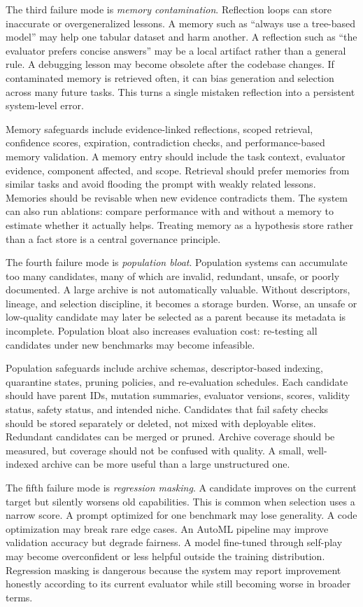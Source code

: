 The third failure mode is \emph{memory contamination}.  Reflection loops can store inaccurate or overgeneralized lessons.  A memory such as ``always use a tree-based model'' may help one tabular dataset and harm another.  A reflection such as ``the evaluator prefers concise answers'' may be a local artifact rather than a general rule.  A debugging lesson may become obsolete after the codebase changes.  If contaminated memory is retrieved often, it can bias generation and selection across many future tasks.  This turns a single mistaken reflection into a persistent system-level error.

Memory safeguards include evidence-linked reflections, scoped retrieval, confidence scores, expiration, contradiction checks, and performance-based memory validation.  A memory entry should include the task context, evaluator evidence, component affected, and scope.  Retrieval should prefer memories from similar tasks and avoid flooding the prompt with weakly related lessons.  Memories should be revisable when new evidence contradicts them.  The system can also run ablations: compare performance with and without a memory to estimate whether it actually helps.  Treating memory as a hypothesis store rather than a fact store is a central governance principle.

The fourth failure mode is \emph{population bloat}.  Population systems can accumulate too many candidates, many of which are invalid, redundant, unsafe, or poorly documented.  A large archive is not automatically valuable.  Without descriptors, lineage, and selection discipline, it becomes a storage burden.  Worse, an unsafe or low-quality candidate may later be selected as a parent because its metadata is incomplete.  Population bloat also increases evaluation cost: re-testing all candidates under new benchmarks may become infeasible.

Population safeguards include archive schemas, descriptor-based indexing, quarantine states, pruning policies, and re-evaluation schedules.  Each candidate should have parent IDs, mutation summaries, evaluator versions, scores, validity status, safety status, and intended niche.  Candidates that fail safety checks should be stored separately or deleted, not mixed with deployable elites.  Redundant candidates can be merged or pruned.  Archive coverage should be measured, but coverage should not be confused with quality.  A small, well-indexed archive can be more useful than a large unstructured one.

The fifth failure mode is \emph{regression masking}.  A candidate improves on the current target but silently worsens old capabilities.  This is common when selection uses a narrow score.  A prompt optimized for one benchmark may lose generality.  A code optimization may break rare edge cases.  An AutoML pipeline may improve validation accuracy but degrade fairness.  A model fine-tuned through self-play may become overconfident or less helpful outside the training distribution.  Regression masking is dangerous because the system may report improvement honestly according to its current evaluator while still becoming worse in broader terms.

